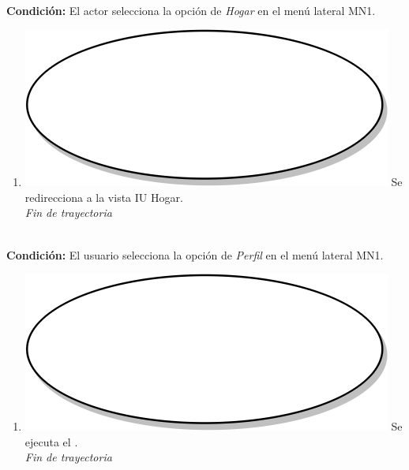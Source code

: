 \textbf{} \\
\textbf{Condición:} El actor selecciona la opción de \textit{Hogar} en el menú lateral MN1. \\
 \begin{enumerate}[label=B\arabic*]
    \item {\includegraphics[scale=.05]{Capitulo3/img/proceso.png} Se redirecciona a la vista IU Hogar.} \\
    \textit{Fin de trayectoria} \\
\end{enumerate}

\textbf{} \\
\textbf{Condición:} El usuario selecciona la opción de \textit{Perfil} en el menú lateral MN1. \\
 \begin{enumerate}[label=C\arabic*]
    \item {\includegraphics[scale=.05]{Capitulo3/img/proceso.png} Se ejecuta el \textbf{}.} \\
    \textit{Fin de trayectoria} \\
\end{enumerate}

